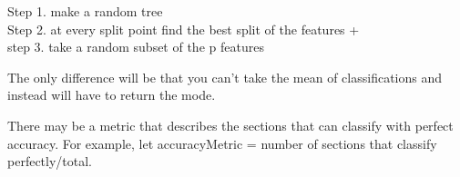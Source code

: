\documentclass[12pt]{article}
\begin{document}
\begin{enumerate}


Step 1. make a random tree
\\Step 2. at every split point find the best split of the features
+\\step 3. take a random subset of the p features

The only difference will be that you can't take the mean of classifications and instead will have to return the mode. 



There may be a metric that describes the sections that can classify with perfect accuracy. For example, let accuracyMetric = number of sections that classify perfectly/total. 


\end{enumerate}
\end{document}
